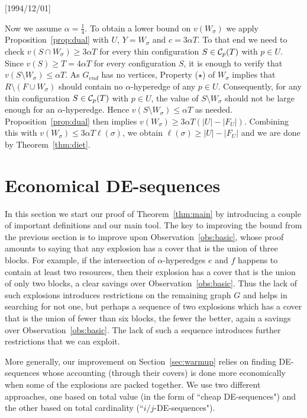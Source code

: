 \NeedsTeXFormat{LaTeX2e}[1994/12/01]\documentclass[letterpaper, 11pt]{article}
\theoremstyle{definition}
\theoremstyle{remark}
\numberwithin{equation}{section}
\begin{document}
Now we assume $\alpha=  \frac14$. To obtain a lower bound on
$v(W_{\sigma})$ we apply 
Proposition~\ref{prop:dual} with $U$, $Y=W_{\sigma}$ and $c = 3\alpha T$. To that end we need to check $v(S\cap W_{\sigma}) \geq 3\alpha T$ for every
thin configuration $S\in {\cal C}_p(T)$ with $p\in U$.
Since  $v(S) \geq T  = 4\alpha T$ for every configuration $S$, it is enough to verify that
$v(S\setminus W_{\sigma}) \leq \alpha T$. As $G_{end}$ has no vertices, Property ($\star$) of $W_{\sigma}$
implies that $R\setminus (F \cup W_{\sigma})$ should contain no $\alpha$-hyperedge 
of any $p\in U$. Consequently, for any thin configuration
$S\in {\cal C}_p(T)$ with $p\in U$,
the value of $S\setminus W_{\sigma}$ should not be large enough
for an $\alpha$-hyperedge. Hence $v(S\setminus W_{\sigma}) \leq \alpha T$ as needed.
Proposition~\ref{prop:dual} then implies $v(W_{\sigma}) \geq 3\alpha T (|U|-|F_U|)$.
Combining this with $v(W_{\sigma}) \leq 3\alpha T \ell(\sigma)$, we obtain
$\ell (\sigma) \geq |U| -|F_U|$ and we are done by Theorem~\ref{thm:diet}.



\section{Economical DE-sequences}\label{sec:economical}
In this section we start our proof of Theorem~\ref{thm:main} by
introducing a couple of important definitions and our main tool.
The key to improving the bound from the previous section is to improve
upon Observation~\ref{obs:basic}, whose proof amounts to saying that
any explosion has a cover that is the union of three blocks. 
For example, if the intersection of $\alpha$-hyperedges $e$ and $f$ happens
to contain at least two resources, then their explosion has a cover
that is the union of only two blocks, a clear savings over
Observation~\ref{obs:basic}.  Thus the lack of such explosions
introduces restrictions on the remaining graph $G$ and helps in
searching for not one, but perhaps a  sequence of two explosions which
has a cover that is the union of fewer than six blocks, the fewer the better,
again a savings over Observation~\ref{obs:basic}. The lack of such a
sequence introduces further restrictions that we can exploit. 

More generally,  our improvement on Section~\ref{sec:warmup} relies on finding
DE-sequences whose accounting (through their covers) is done more
economically when some of the explosions are packed together.
We use two different approaches, one based on total value (in the form of ``cheap DE-sequences") and the other based on total cardinality (``$i/j$-DE-sequences"). 
\end{document}

